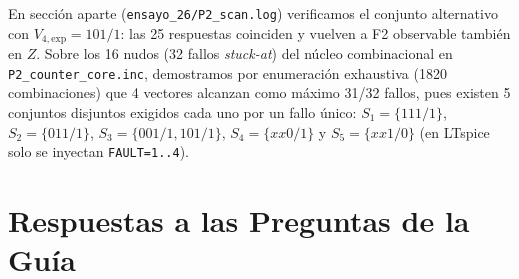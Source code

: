 \documentclass[10pt,twocolumn]{article}
\begin{document}
En sección aparte (\texttt{ensayo\_26/P2\_scan.log}) verificamos el conjunto alternativo con $V_{4,\text{exp}}=101/1$: las 25 respuestas coinciden y vuelven a F2 observable también en $Z$. Sobre los 16 nudos (32 fallos \emph{stuck-at}) del núcleo combinacional en \texttt{P2\_counter\_core.inc}, demostramos por enumeración exhaustiva (1820 combinaciones) que 4 vectores alcanzan como máximo 31/32 fallos, pues existen 5 conjuntos disjuntos exigidos cada uno por un fallo único: $S_1=\{111/1\}$, $S_2=\{011/1\}$, $S_3=\{001/1,101/1\}$, $S_4=\{xx0/1\}$ y $S_5=\{xx1/0\}$ (en LTspice solo se inyectan \texttt{FAULT=1..4}).

\section{Respuestas a las Preguntas de la Guía}
\end{document}
